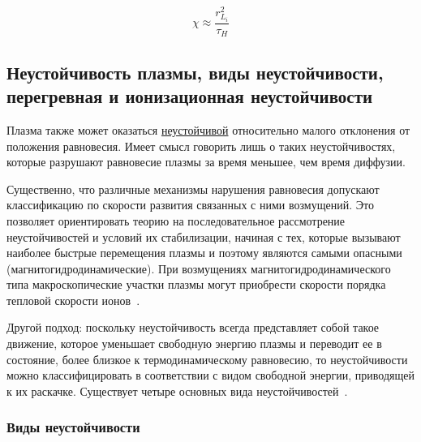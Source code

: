 \documentclass[10pt, a4paper]{article}
\begin{document}
\begin{equation*}
	\chi\approx\frac{r^2_{L_i}}{\tau_H}
\end{equation*}

\subsection{Неустойчивость плазмы, виды неустойчивости, перегревная и ионизационная неустойчивости} \label{subsec:plasma_instabilities}

Плазма также может оказаться
\uline{неустойчивой} относительно малого отклонения от положения равновесия. Имеет смысл говорить лишь о таких неустойчивостях, которые разрушают равновесие плазмы за время меньшее, чем время диффузии.

Существенно, что различные механизмы нарушения равновесия допускают классификацию по скорости развития связанных с ними возмущений. Это позволяет ориентировать теорию на последовательное рассмотрение неустойчивостей и условий их стабилизации, начиная с тех, которые вызывают наиболее быстрые перемещения плазмы и поэтому являются самыми опасными (магнитогидродинамические). При возмущениях магнитогидродинамического типа макроскопические участки плазмы могут приобрести скорости порядка тепловой скорости ионов~\cite{arzimovich}. 

Другой подход: поскольку неустойчивость всегда представляет собой такое движение, которое уменьшает свободную энергию плазмы и переводит ее в состояние, более близкое к термодинамическому равновесию, то неустойчивости можно классифицировать в соответствии с видом свободной энергии, приводящей к их раскачке. Существует
четыре основных вида неустойчивостей~\cite{chen}.

\subsubsection{Виды неустойчивости} \label{subsubsec:instabilities}
\end{document}
